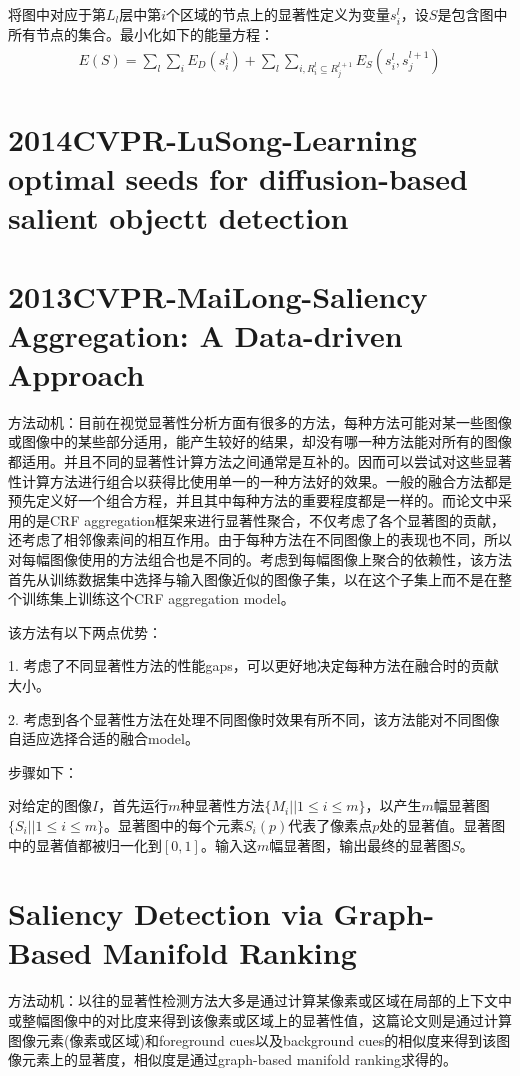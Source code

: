 \documentclass[12pt]{article}
\begin{document}
将图中对应于第$L_l$层中第$i$个区域的节点上的显著性定义为变量$s_i^l$，设$S$是包含图中所有节点的集合。最小化如下的能量方程：
\begin{align}
E(S) = \sum_l \sum_i E_D(s_i^l)+\sum_l \sum_{i, R_i^l \subseteq R_j ^{l+1}} E_S(s_i^l, s_j^{l+1})
\end{align}

\section{2014CVPR-LuSong-Learning optimal seeds for diffusion-based salient objectt detection}

\section{2013CVPR-MaiLong-Saliency Aggregation: A Data-driven Approach}

方法动机：目前在视觉显著性分析方面有很多的方法，每种方法可能对某一些图像或图像中的某些部分适用，能产生较好的结果，却没有哪一种方法能对所有的图像都适用。并且不同的显著性计算方法之间通常是互补的。因而可以尝试对这些显著性计算方法进行组合以获得比使用单一的一种方法好的效果。一般的融合方法都是预先定义好一个组合方程，并且其中每种方法的重要程度都是一样的。而论文中采用的是CRF aggregation框架来进行显著性聚合，不仅考虑了各个显著图的贡献，还考虑了相邻像素间的相互作用。由于每种方法在不同图像上的表现也不同，所以对每幅图像使用的方法组合也是不同的。考虑到每幅图像上聚合的依赖性，该方法首先从训练数据集中选择与输入图像近似的图像子集，以在这个子集上而不是在整个训练集上训练这个CRF aggregation model。

该方法有以下两点优势：

1. 考虑了不同显著性方法的性能gaps，可以更好地决定每种方法在融合时的贡献大小。

2. 考虑到各个显著性方法在处理不同图像时效果有所不同，该方法能对不同图像自适应选择合适的融合model。

步骤如下：

对给定的图像$I$，首先运行$m$种显著性方法$\{M_i||1\le i\le m\}$，以产生$m$幅显著图$\{S_i||1\le i\le m\}$。显著图中的每个元素$S_i(p)$代表了像素点$p$处的显著值。显著图中的显著值都被归一化到$[0, 1]$。输入这$m$幅显著图，输出最终的显著图$S$。

\section{Saliency Detection via Graph-Based Manifold Ranking}

方法动机：以往的显著性检测方法大多是通过计算某像素或区域在局部的上下文中或整幅图像中的对比度来得到该像素或区域上的显著性值，这篇论文则是通过计算图像元素(像素或区域)和foreground cues以及background cues的相似度来得到该图像元素上的显著度，相似度是通过graph-based manifold ranking求得的。
\end{document}
